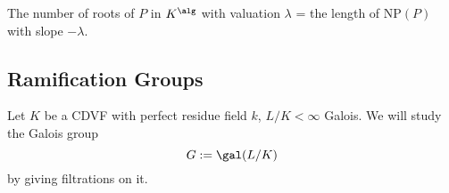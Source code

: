 \begin{theorem}
    The number of roots of $P$ in $K^\alg$ with valuation $\lambda$ = the length of $\mathrm{NP}(P)$ with slope $-\lambda$.
\end{theorem}

\subsection{Ramification Groups}

Let $K$ be a CDVF with perfect residue field $k$, $L/K<\infty$ Galois. We will study the Galois group \[G := \gal(L/K)\] by giving filtrations on it.




